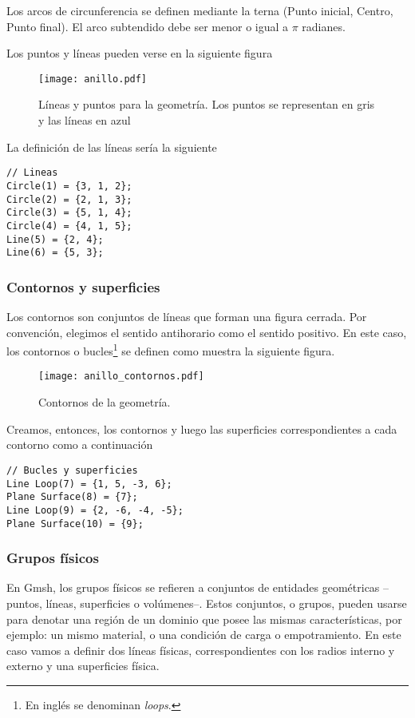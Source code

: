 Los arcos de circunferencia se definen mediante la terna (Punto inicial, Centro, Punto final). El arco subtendido debe ser menor o igual a \(\pi\) radianes.

Los puntos y líneas pueden verse en la siguiente figura
\begin{figure}[H]
    \centering
    \texttt{[image: anillo.pdf]}
    \caption{Líneas y puntos para la geometría. Los puntos se representan en gris y las líneas en azul}
    \label{fig:geo_puntos}
\end{figure}

La definición de las líneas sería la siguiente
\begin{verbatim}
// Lineas
Circle(1) = {3, 1, 2};
Circle(2) = {2, 1, 3};
Circle(3) = {5, 1, 4};
Circle(4) = {4, 1, 5};
Line(5) = {2, 4};
Line(6) = {5, 3};
\end{verbatim}

\subsubsection{Contornos y superficies}
Los contornos son conjuntos de líneas que forman una figura cerrada. Por convención, elegimos el
sentido antihorario como el sentido positivo. En este caso, los contornos o bucles\footnote{En inglés se denominan \emph{loops}.} se definen como muestra la siguiente figura.
\begin{figure}[h]
    \centering
    \texttt{[image: anillo\_contornos.pdf]}
    \caption{Contornos de la geometría.}
    \label{fig:geo_contornos}
\end{figure}

Creamos, entonces, los contornos y luego las superficies correspondientes a cada contorno como
a continuación

\begin{verbatim}
// Bucles y superficies
Line Loop(7) = {1, 5, -3, 6};
Plane Surface(8) = {7};
Line Loop(9) = {2, -6, -4, -5};
Plane Surface(10) = {9};
\end{verbatim}

\subsubsection{Grupos físicos}
En Gmsh, los grupos físicos se refieren a conjuntos de entidades geométricas --puntos, líneas, superficies o volúmenes--. Estos conjuntos, o grupos, pueden usarse para denotar una región
de un dominio que posee las mismas características, por ejemplo: un mismo material, o
una condición de carga o empotramiento. En este caso vamos a definir dos líneas físicas, 
correspondientes con los radios interno y externo y una superficies física.

